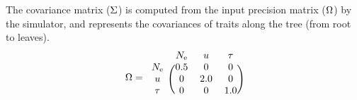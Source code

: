 \documentclass{article}
\begin{document}
	The covariance matrix ($\Sigma$) is computed from the input precision matrix ($\Omega$) by the simulator, and represents the covariances of traits along the tree (from root to leaves).
	\begin{equation}
		\PrecisionMatrix =
		\begin{blockarray}{cccc}
			& \Ne & u & \tau \\
			\begin{block}{c(ccc)}
				\Ne  & 0.5 & 0 & 0 \\
				u    & 0 & 2.0 & 0 \\
				\tau & 0 & 0 & 1.0 \\
			\end{block}
		\end{blockarray}
	\end{equation}
\end{document}
